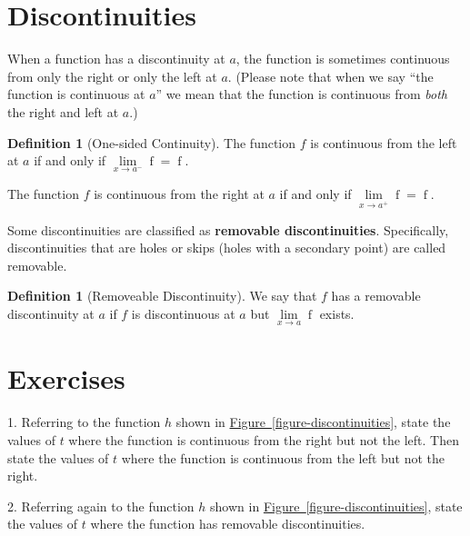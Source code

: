 \documentclass[12pt,]{book}
\newcommand{\terminology}[1]{\textbf{#1}}
\theoremstyle{plain}
\theoremstyle{definition}
\newtheorem{definition}[theorem]{Definition}
\numberwithin{equation}{section}
\providecommand\phantomsection{}
\newcommand{\fe}[2]{\mathop{{#1}{\left(#2\right)}}}
\begin{document}
\section[Discontinuities]{Discontinuities}\label{section-discontinuities}
When a function has a discontinuity at \(a\), the function is sometimes continuous from only the right or only the left at \(a\). (Please note that when we say ``the function is continuous at \(a\)'' we mean that the function is continuous from \emph{both} the right and left at \(a\).)%
\begin{definition}[One-sided Continuity]\label{definition-4}
The function \(f\) is continuous from the left at \(a\) if and only if \(\lim\limits_{x\to a^{-}}\fe{f}{x}=\fe{f}{a}\).%
\par
The function \(f\) is continuous from the right at \(a\) if and only if \(\lim\limits_{x\to a^{+}}\fe{f}{x}=\fe{f}{a}\).%
\end{definition}
\par
Some discontinuities are classified as \terminology{removable discontinuities}. Specifically, discontinuities that are holes or skips (holes with a secondary point) are called removable.%
\begin{definition}[Removeable Discontinuity]\label{definition-5}
We say that \(f\) has a removable discontinuity at \(a\) if \(f\) is discontinuous at \(a\) but \(\lim\limits_{x\to a}\fe{f}{x}\) exists.%
\end{definition}
\typeout{************************************************}
\typeout{************************************************}
\section*{Exercises}\label{exercises-14}

\begin{exerciselist}
\item[1.]\phantomsection\hypertarget{exercise-110}{\null}Referring to the function \(h\) shown in \hyperref[figure-discontinuities]{Figure~\ref*{figure-discontinuities}}, state the values of \(t\) where the function is continuous from the right but not the left. Then state the values of \(t\) where the function is continuous from the left but not the right.%
\par\smallskip
\item[2.]\phantomsection\hypertarget{exercise-111}{\null}Referring again to the function \(h\) shown in \hyperref[figure-discontinuities]{Figure~\ref*{figure-discontinuities}}, state the values of \(t\) where the function has removable discontinuities.%
\par\smallskip
\end{exerciselist}
\typeout{************************************************}
\typeout{************************************************}
\end{document}
